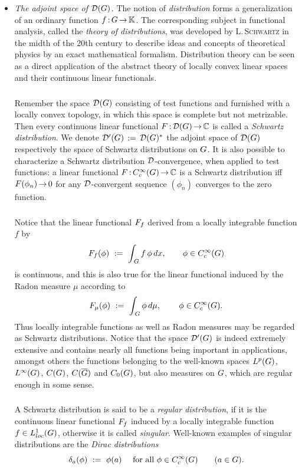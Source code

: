 \documentclass[11pt,twoside]{article}
\begin{document}
\begin{itemize}[leftmargin=15pt,itemsep=6pt]
\subparagraph*{}
Now the \textsc{Riesz-Markov} theorem quotes that
\textit{every} continuous linear functional $G$ on $C[a,b]$ arises
as Riemann-Stieltjes integral
{\wrt} a certain function $g$ of bounded variation,
that is,
we have $C[a,b]^* \cong BV(a,b)$.

\item[5.] \textit{The adjoint space of ${\mathcal{D}}(G)$.}
The notion of \textit{distribution} forms a generalization
of an ordinary function $f{\,:\,}G {\,\to\,} {\mathbb{K}}$.
The corresponding subject in functional analysis,
called the \textit{theory of distributions},
was developed by \textsc{L.\,Schwartz} in the midth of the 20th century
to describe ideas and concepts of theoretical physics
by an exact mathematical formalism.
Distribution theory can be seen as a direct application
of the abstract theory of locally convex linear spaces
and their continuous linear functionals.

\subparagraph*{}
Remember the space ${\mathcal{D}}(G)$ consisting of test functions and furnished
with a locally convex topology,
in which this space is complete but not metrizable.
Then every continuous linear functional $F{\,:\,}{\mathcal{D}}(G) {\,\to\,} {\mathbb{C}}$ 
is called a \textit{Schwartz distribution}.
We denote ${\mathcal{D}}'(G) \,:=\, {\mathcal{D}}(G)^*$ the adjoint space of ${\mathcal{D}}(G)$
respectively the space of Schwartz distributions on $G$.
It is also possible to characterize a Schwartz distribution
{\wrt} ${\mathcal{D}}$-convergence,
when applied to test functions:
a linear functional $F{\,:\,}C_c^{\infty}(G) {\,\to\,} {\mathbb{C}}$
is a Schwartz distribution
iff $F(\phi_n) {\,\to\,} 0$ for any ${\mathcal{D}}$-convergent sequence $(\phi_n)$
converges to the zero function.

\subparagraph*{} %
Notice that the linear functional $F_f$
derived from a locally integrable function $f$ by
\[
F_f(\phi) \, \,:=\, \, \int_{\,G} f \, \phi \, dx,
\quad \quad \phi \in C_c^{\infty}(G)
\]
is continuous,
and this is also true for the linear functional
induced by the Radon measure $\mu$ according to
\[
F_{\mu}(\phi) \, \,:=\, \, \int_{\,G} \phi \, d\mu,
\quad \quad \, \phi \in C_c^{\infty}(G).
\]
Thus locally integrable functions as well as Radon measures
may be regarded as Schwartz distributions.
Notice that the space ${\mathcal{D}}'(G)$ is indeed extremely extensive
and contains nearly all functions being important in applications,
amongst others the functions belonging to the well-known spaces
$L^p(G)$, $L^{\infty}(G)$, $C(G)$, $C(\overline{G})$ and $C_0(G)$,
but also measures on $G$,
which are regular enough in some sense.

\subparagraph*{}
A Schwartz distribution is said to be a \textit{regular distribution},
if it is the continuous linear functional $F_f$
induced by a locally integrable function $f \in L_{loc}^1(G)$,
otherwise it is called \textit{singular}.
Well-known examples of singular distributions are
the \textit{Dirac distributions}
\[
\delta_a(\phi) \, \,:=\, \, \phi(a)
\quad \mbox{ for all } \phi \in C_c^{\infty}(G)
\quad \quad  (a \in G).
\]


\end{itemize}
\end{document}
